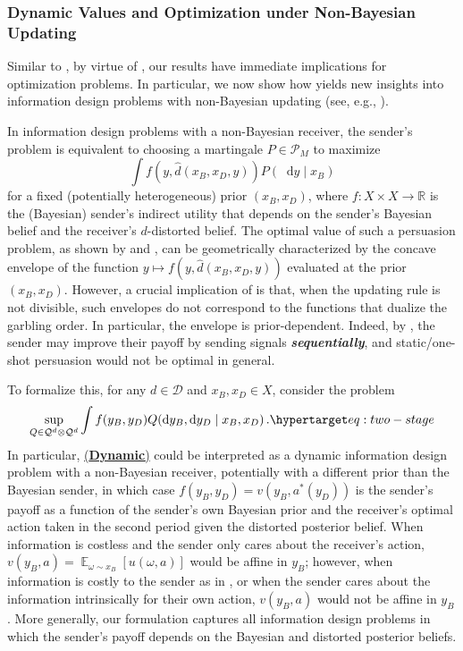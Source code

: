 \documentclass[12pt,letterpaper]{article}
\newenvironment{original}{\color{black}}{}
\theoremstyle{plain}
\theoremstyle{definition}
\theoremstyle{remark}
\DeclareMathOperator{\E}{\mathds{E}}
\newcommand{\Pc}{\mathcal{P}}
\newcommand{\R}{\mathds{R}}
\newcommand{\cQ}{\mathcal{Q}}
\renewcommand*\d{\mathop{}\!\mathrm{d}}
\theoremstyle{definition}
\DeclareRobustCommand{\weqref}[2]{
  \leavevmode\nobreak\hbox{\hyperlink{#2}{\textup{(#1)}}}
}
\begin{document}
\subsubsection{Dynamic Values and Optimization under Non-Bayesian Updating}
\begin{original}
Similar to , by virtue of , our results have immediate implications for optimization problems. In particular, we now show how  yields new insights into information design problems with non-Bayesian updating (see, e.g., \citealt{alonso2016bayesian,de2022non,azrieli2025sequential,kobayashi2025dynamic}).

In information design problems with a non-Bayesian receiver, the sender's problem is equivalent to choosing a martingale $P \in \Pc_M$ to maximize
\[
\int f(y,\hat{d}(x_B,x_D,y))P(\d y\mid x_B)
\]
for a fixed (potentially heterogeneous) prior $(x_B,x_D)$, where $f:X \times X \to \R$ is the (Bayesian) sender's indirect utility that depends on the sender's Bayesian belief and the receiver's $d$-distorted belief. The optimal value of such a persuasion problem, as shown by \citet{alonso2016bayesian} and \citet{de2022non}, can be geometrically characterized by the concave envelope of the function $y \mapsto f(y,\hat{d}(x_B,x_D,y))$ evaluated at the prior $(x_B,x_D)$. However, a crucial implication of  is that, when the updating rule is not divisible, such envelopes do not correspond to the functions that dualize the garbling order. In particular, the envelope is prior-dependent. Indeed, by , the sender may improve their payoff by sending signals \textit{\textbf{sequentially}}, and static/one-shot persuasion would not be optimal in general.

To formalize this, for any $d \in \mathcal{D}$ and $x_B,x_D \in X$, consider the problem
\begin{equation*}
\sup_{Q \in \cQ^{d} \otimes \cQ^d} \int f(y_B,y_D) Q(\d y_B, \d y_D \mid x_B,x_D)\,. \eqtag[-2.5em][0.8\baselineskip]{\textbf{Dynamic}}{eq:two-stage}
\end{equation*}
In particular, \weqref{\textbf{Dynamic}}{eq:two-stage} could be interpreted as a dynamic information design problem with a non-Bayesian receiver, potentially with a different prior than the Bayesian sender, in which case $f(y_B,y_D)=v(y_B,a^*(y_D))$ is the sender's payoff as a function of the sender's own Bayesian prior and the receiver's optimal action taken in the second period given the distorted posterior belief. When information is costless and the sender only cares about the receiver's action, $v(y_B, a) = \E_{\omega \sim x_B} [u(\omega, a)]$ would be affine in $y_B$; however, when information is costly to the sender as in \citet{gentzkow2014costly}, or when the sender cares about the information intrinsically for their own action, $v(y_B, a)$ would not be affine in $y_B$. More generally, our formulation captures all information design problems in which the sender's payoff depends on the Bayesian and distorted posterior beliefs.


\end{original}
\end{document}
